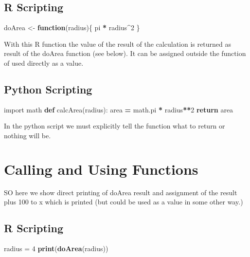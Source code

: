 \documentclass[]{book}
\newenvironment{Shaded}{\begin{snugshade}}{\end{snugshade}}
\newcommand{\KeywordTok}[1]{\textcolor[rgb]{0.13,0.29,0.53}{\textbf{#1}}}
\newcommand{\DecValTok}[1]{\textcolor[rgb]{0.00,0.00,0.81}{#1}}
\newcommand{\StringTok}[1]{\textcolor[rgb]{0.31,0.60,0.02}{#1}}
\newcommand{\ImportTok}[1]{#1}
\newcommand{\ControlFlowTok}[1]{\textcolor[rgb]{0.13,0.29,0.53}{\textbf{#1}}}
\newcommand{\OperatorTok}[1]{\textcolor[rgb]{0.81,0.36,0.00}{\textbf{#1}}}
\newcommand{\NormalTok}[1]{#1}
\theoremstyle{definition}
\theoremstyle{definition}
\theoremstyle{definition}
\theoremstyle{remark}
\begin{document}
\subsection{R Scripting}\label{r-scripting-1}

\begin{Shaded}
\begin{Highlighting}[]
\NormalTok{doArea <-}\StringTok{ }\ControlFlowTok{function}\NormalTok{(radius)\{}
\NormalTok{  pi }\OperatorTok{*}\StringTok{ }\NormalTok{radius}\OperatorTok{^}\DecValTok{2}
\NormalTok{\}}
\end{Highlighting}
\end{Shaded}

With this R function the value of the result of the calculation is
returned as result of the doArea function (see below). It can be
assigned outside the function of used directly as a value.

\subsection{Python Scripting}\label{python-scripting-1}

\begin{Shaded}
\begin{Highlighting}[]
\ImportTok{import}\NormalTok{ math}
\KeywordTok{def}\NormalTok{ calcArea(radius):}
\NormalTok{  area }\OperatorTok{=}\NormalTok{ math.pi }\OperatorTok{*}\NormalTok{ radius}\OperatorTok{**}\DecValTok{2}
  \ControlFlowTok{return}\NormalTok{ area}
\end{Highlighting}
\end{Shaded}

In the python script we must explicitly tell the function what to return
or nothing will be.

\section{Calling and Using Functions}\label{calling-and-using-functions}

SO here we show direct printing of doArea result and assignment of the
result plus 100 to x which is printed (but could be used as a value in
some other way.)

\subsection{R Scripting}\label{r-scripting-2}

\begin{Shaded}
\begin{Highlighting}[]
\NormalTok{radius =}\StringTok{ }\DecValTok{4}
\KeywordTok{print}\NormalTok{(}\KeywordTok{doArea}\NormalTok{(radius))}
\end{Highlighting}
\end{Shaded}
\end{document}

